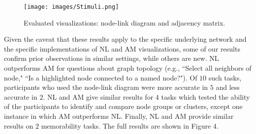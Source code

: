 \begin{figure*}[t]
  \centering
  \texttt{[image: images/Stimuli.png]}
  \caption{Evaluated visualizations: node-link diagram and adjacency matrix.}
	\label{fig:dataModel}
\end{figure*}
Given the caveat that these results apply to the specific underlying network and the specific implementations of NL and AM visualizations, some of our results confirm prior observations in similar settings, while others are new. 
NL outperforms AM for questions about graph topology (e.g., ``Select all neighbors of node," ``Is a highlighted node connected to a named node?"). 
Of $10$ such tasks, participants who used the node-link diagram were more accurate in $5$ and less accurate in $2$. NL and AM give similar results for $4$ tasks which tested the ability of the participants to identify and compare node groups or clusters,  %
except one instance in which AM outperforms NL. Finally, NL and AM provide similar results on $2$ memorability tasks. The full results are shown in Figure 4.








